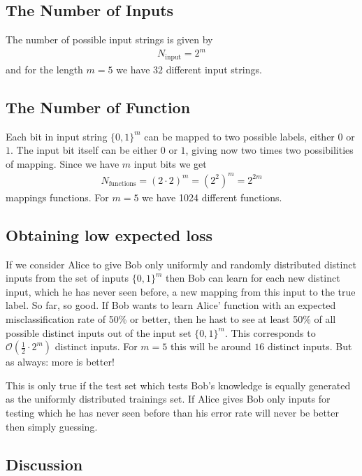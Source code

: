 \documentclass[12pt]{article}
\begin{document}
\subsection{The Number of Inputs}

The number of possible input strings is given by 
\begin{align}
N_\text{input}=2^m 
\end{align}
and for the length $m=5$ we have $32$ different input strings.

\subsection{The Number of Function}

Each bit in input string $\{0,1\}^m$ can be mapped to two possible labels, either $0$ or $1$. The input bit itself can be either $0$ or $1$, giving now two times two possibilities of mapping. Since we have $m$ input bits we get 
\begin{align}
	N_\text{functions}=\left(2\cdot 2\right)^{m}=(2^2)^m=2^{2m}
\end{align}
mappings functions. For $m=5$ we have 1024 different functions. 

\subsection{Obtaining low expected loss}

If we consider Alice to give Bob only uniformly and randomly distributed distinct inputs from the set of inputs $\{0,1\}^m$ then Bob can learn for each new distinct input, which he has never seen before, a new mapping from this input to the true label. So far, so good. If Bob wants to learn Alice' function with an expected misclassification rate of 50\% or better, then he hast to see at least 50\% of all possible distinct inputs out of the input set $\{0,1\}^m$. This corresponds to $\mathcal{O}(\frac{1}{2}\cdot 2^m)$ distinct inputs. For $m=5$ this will be around $16$ distinct inputs. But as always: more is better!\par 
This is only true if the test set which tests Bob's knowledge is equally generated as the uniformly distributed trainings set. If Alice gives Bob only inputs for testing which he has never seen before than his error rate will never be better then simply guessing. 

\subsection{Discussion}
\end{document}
